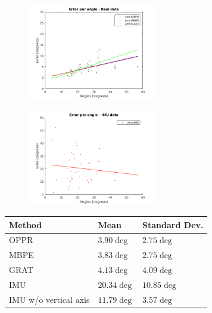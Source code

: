 \begin{figure}
\centering
\includegraphics[width=0.5\textwidth]{images/r1angle.png}
\label{cha5:sec1:r1angle}
\end{figure}
\begin{figure}
\centering
\includegraphics[width=0.5\textwidth]{images/r1angleimu.png}
\label{cha5:sec1:r1angleimu}
\end{figure}

\begin{table}[ht]
	\centering
\begin{tabular}{| l | l | l |}
	\hline
	Method & Mean & Standard Dev. \\
	\hline
	OPPR &  $3.90 \deg$ & $2.75 \deg$ \\
	\hline
	MBPE &  $3.83 \deg$ & $2.75 \deg$ \\
	\hline
	GRAT &  $4.13 \deg$ & $4.09 \deg$ \\ 
	\hline
	IMU &  $20.34 \deg$ & $10.85 \deg$ \\ 
	\hline
	IMU w/o vertical axis &  $11.79 \deg$ & $3.57 \deg$ \\ 
	\hline
\end{tabular}
\label{cha5:sec1:r1anglet}
\end{table}

